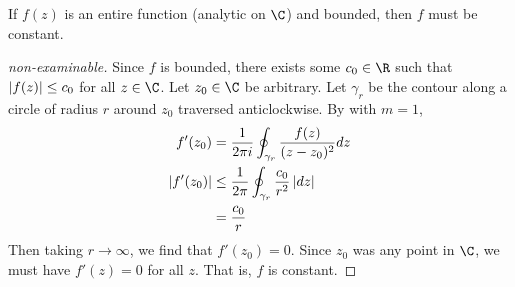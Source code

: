 \documentclass[../Main.tex]{subfiles}
\begin{document}
\begin{theorem}
    If $f(z)$ is an entire function (analytic on $\C$) and bounded, then $f$ must be constant.
    \label{thmEntireBddConst}
\end{theorem}
\begin{proof}[non-examinable]
    Since $f$ is bounded, there exists some $c_0 \in \R$ such that $\left|f(z)\right| \leq c_0$ for all $z \in \C$. Let $z_0 \in \C$ be arbitrary. Let $\gamma_r$ be the contour along a circle of radius $r$ around $z_0$ traversed anticlockwise. By  with $m = 1$,
    \begin{align*}
        f'(z_0) &= \frac{1}{2\pi i} \oint_{\gamma_r}\frac{f(z)}{(z - z_0)^2} dz \\
        \left|f'(z_0)\right| &\leq \frac{1}{2\pi} \oint_{\gamma_r} \frac{c_0}{r^2} \left|dz\right| \\
        &= \frac{c_0}{r}
    \end{align*}
    Then taking $r \to \infty$, we find that $f'(z_0) = 0$. Since $z_0$ was any point in $\C$, we must have $f'(z) = 0$ for all $z$. That is, $f$ is constant.
\end{proof}
\end{document}
